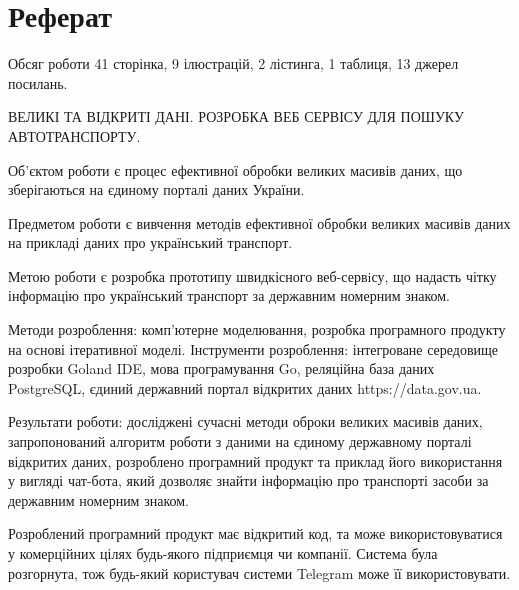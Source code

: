 \chapter*{Реферат}
Обсяг роботи 41 сторінка, 9 ілюстрацій, 2 лістинга, 1 таблиця, 13 джерел посилань.

ВЕЛИКІ ТА ВІДКРИТІ ДАНІ. РОЗРОБКА ВЕБ СЕРВІСУ ДЛЯ ПОШУКУ АВТОТРАНСПОРТУ.

Об'єктом роботи є процес ефективної обробки великих масивів даних,
що зберігаються на єдиному порталі даних України.

Предметом роботи є вивчення методів ефективної обробки
великих масивів даних на прикладі даних про український транспорт.

Метою роботи є розробка прототипу швидкісного веб-сервiсу,
що надасть чітку інформацію про український транспорт за
державним номерним знаком.

Методи розроблення: комп'ютерне моделювання, розробка програмного продукту на основі ітеративної
моделі.
Інструменти розроблення: інтегроване середовище розробки Goland IDE,
мова програмування Go, реляційна  база даних PostgreSQL, єдиний державний портал відкритих даних https://data.gov.ua.

Результати роботи: досліджені сучасні методи оброки великих масивів даних,
запропонований алгоритм роботи з даними на єдиному державному порталі відкритих даних,
розроблено програмний продукт та приклад його використання у вигляді чат-бота,
який дозволяє знайти інформацію про транспорті засоби за державним номерним знаком.

Розроблений програмний продукт має відкритий код,
та може використовуватися у комерційних цілях будь-якого підприємця чи компанії.
Система була розгорнута, тож будь-який користувач системи Telegram може її використовувати.
